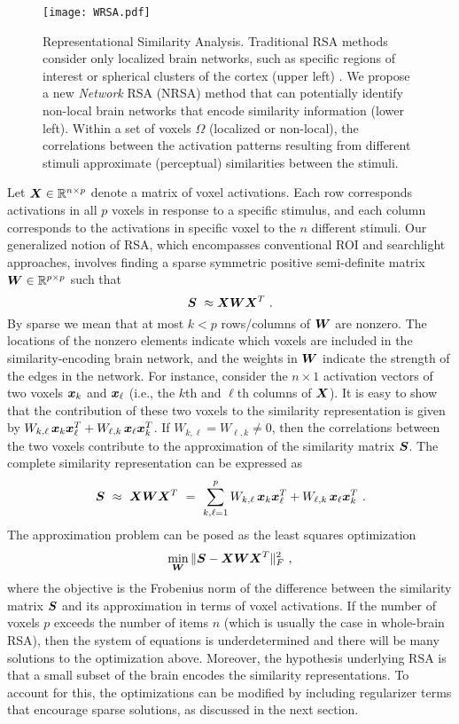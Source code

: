 \begin{figure}[!h]
	\centering
	          \texttt{[image: WRSA.pdf]} \\
	        
	\caption{Representational Similarity Analysis.  Traditional RSA methods consider only localized brain networks, such as specific regions of interest or spherical clusters of the cortex (upper left) \cite{RSA,searchlight}.  We propose a new {\em Network} RSA (NRSA) method that can potentially identify non-local brain networks that encode similarity information (lower left).  Within a set of voxels $\Omega$ (localized or non-local), the correlations between the activation patterns resulting from different stimuli approximate (perceptual) similarities between the stimuli.  } \label{Fig:WRSA}
	\label{fig.fitting}
\end{figure}


Let $\boldsymbol{X} \in {\mathbb R}^{n\times p}$ denote a matrix of voxel activations.
Each row corresponds activations in all $p$ voxels in response to a specific stimulus, and each column corresponds to the activations in specific voxel to the $n$ different stimuli.  Our generalized notion of RSA,
which encompasses conventional ROI \cite{RSA} and searchlight \cite{searchlight} approaches, involves finding a sparse symmetric positive semi-definite matrix  $\boldsymbol{W}\in {\mathbb R}^{p\times p}$ such that
$$\bS \ \approx \bX \bW \bX^T \ .$$
By sparse we mean that at most $k<p$ rows/columns of $\boldsymbol{W}$ are nonzero.   The locations of the nonzero elements indicate which voxels are included in the similarity-encoding brain network, and the  weights in $\boldsymbol{W}$ indicate the strength of the edges in the network.  For instance, consider the $n\times 1$ activation vectors of two voxels $\boldsymbol{x}_k$ and $\boldsymbol{x}_{\ell}$ (i.e., the $k$th and $\ell$th columns of $\boldsymbol{X}$).  It is easy to show that the contribution of these two voxels to the similarity representation is given by $ W_{k,\ell} \, \boldsymbol{x}_k \boldsymbol{x}_{\ell}^T + W_{\ell,k} \, \boldsymbol{x}_\ell \boldsymbol{x}_{k}^T$.  If $W_{k,\ell}=W_{\ell,k}\neq 0$, then the correlations between the two voxels contribute to the approximation of the similarity matrix $\boldsymbol{S}$. The complete similarity representation can be expressed as
$$\bS \ \approx \ \bX\bW\bX^T \ = \ \sum_{k,\ell=1}^p W_{k,\ell} \, \bx_k \bx_{\ell}^T + W_{\ell,k} \, \bx_\ell \bx_{k}^T  \ .$$
The approximation problem can be posed as the least squares optimization
$$\min_{\boldsymbol{W}} \|\boldsymbol{S}-\boldsymbol{X}\boldsymbol{W}\boldsymbol{X}^T\|_F^2 \ , $$
where the objective is the Frobenius norm of the difference between the similarity matrix $\boldsymbol{S}$ and its approximation in terms of voxel activations.  If the number of voxels $p$ exceeds the number of items $n$ (which is usually the case in whole-brain RSA), then the system of equations is underdetermined and there will be many solutions to the optimization above.  Moreover, the hypothesis underlying RSA is that a small subset of the brain encodes the similarity representations.  To account for this,
the optimizations can be modified by including regularizer terms that encourage sparse solutions, as discussed in the next section.



